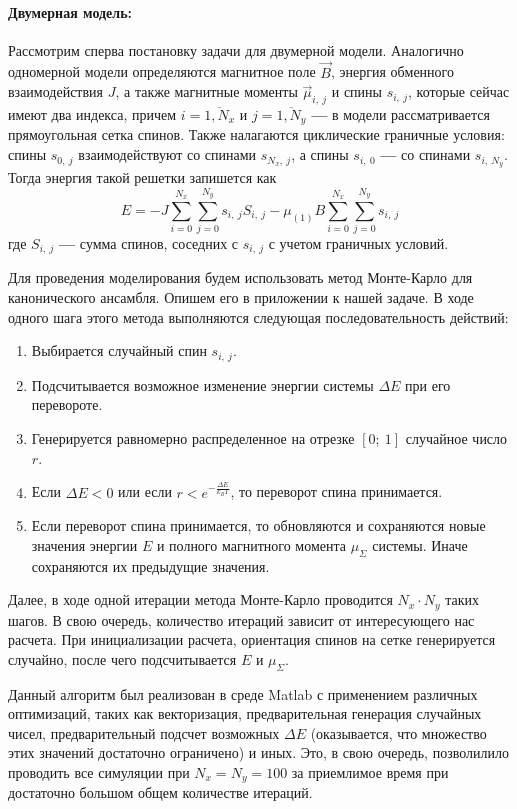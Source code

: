 \documentclass[oneside,final,14pt]{extarticle}
\begin{document}
	\paragraph{Двумерная модель:}
	Рассмотрим сперва постановку задачи для двумерной модели. Аналогично одномерной модели определяются магнитное поле $\vec B$, энергия обменного взаимодействия $J$, а также  магнитные моменты $\vec \mu_{i,\ j}$ и спины $s_{i,\ j}$, которые сейчас имеют два индекса, причем $i=\overline{1, N_{x}}$ и $j=\overline{1, N_{y}}$ \textbf{---} в модели рассматривается прямоугольная сетка спинов. Также налагаются циклические граничные условия: спины $s_{0,\ j}$ взаимодействуют со спинами $s_{N_{x}, \ j}$, а спины $s_{i, \ 0}$ \textbf{---} со спинами $s_{i, \ N_{y}}$. Тогда энергия такой решетки запишется как 
$$E=-J\sum_{i = 0}^{N_{x}}\sum_{j=0}^{N_{y}}s_{i, \ j}S_{i, \ j}-\mu_{(1)}B\sum_{i = 0}^{N_{x}}\sum_{j=0}^{N_{y}}s_{i, \ j}$$
	где $S_{i, \ j}$ \textbf{---} сумма спинов, соседних с $s_{i, \ j}$ с учетом граничных условий. 

	Для проведения моделирования будем использовать метод Монте-Карло для канонического ансамбля. Опишем его в приложении к нашей задаче. В ходе одного шага этого метода выполняются следующая последовательность действий:
	\begin{enumerate}
	\item Выбирается случайный спин $s_{i, \ j}$.
	\item Подсчитывается возможное изменение энергии системы $\Delta E$ при его перевороте. 
	\item Генерируется равномерно распределенное на отрезке $[0; \ 1]$ случайное число $r$.
	\item Если $\Delta E < 0$ или если $r<e^{-\frac{\Delta E}{k_{B}T}}$, то переворот спина принимается.
	\item Если переворот спина принимается, то обновляются и сохраняются новые значения энергии $E$ и полного магнитного момента $\mu_{\Sigma}$ системы. Иначе сохраняются их предыдущие значения.
	\end{enumerate}
	Далее, в ходе одной итерации метода Монте-Карло проводится $N_{x} \cdot N_{y}$ таких шагов. В свою очередь, количество итераций зависит от интересующего нас расчета. При инициализации расчета, ориентация спинов на сетке генерируется случайно, после чего подсчитывается $E$ и $\mu_{\Sigma}$.

	Данный алгоритм был реализован в среде Matlab с применением различных оптимизаций, таких как векторизация, предварительная генерация случайных чисел, предварительный подсчет возможных $\Delta E$ (оказывается, что множество этих значений достаточно ограничено) и иных. Это, в свою очередь, позволилило проводить все симуляции при $N_{x}=N_{y}=100$ за приемлимое время при достаточно большом общем количестве итераций. 
\end{document}
